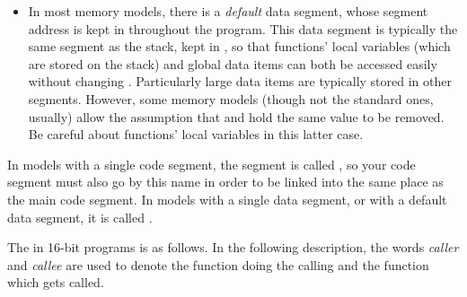 \begin{itemize}
    \item{In most memory models, there is a \emph{default} data segment, whose
        segment address is kept in  throughout the program. This data
        segment is typically the same segment as the stack, kept in ,
        so that functions' local variables (which are stored on the stack)
        and global data items can both be accessed easily without changing
        . Particularly large data items are typically stored in other
        segments. However, some memory models (though not the standard
        ones, usually) allow the assumption that  and  hold the
        same value to be removed. Be careful about functions' local
        variables in this latter case.}
\end{itemize}

In models with a single code segment, the segment is called ,
so your code segment must also go by this name in order to be linked into the
same place as the main code segment. In models with a single data segment,
or with a default data segment, it is called .


The 
in 16-bit programs is as follows. In the following description, the
words \emph{caller} and \emph{callee} are used to denote the function
doing the calling and the function which gets called.

